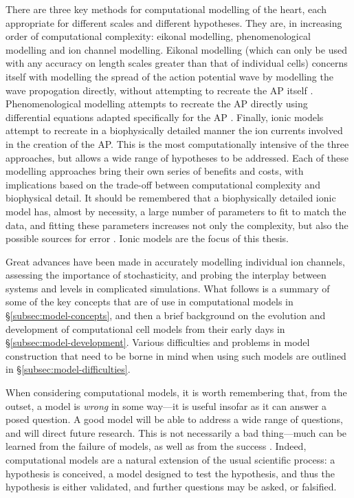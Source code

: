 \documentclass[../thesis-main.tex]{subfiles}
\begin{document}
There are three key methods for computational modelling of the heart, each appropriate for different scales and different hypotheses. They are, in increasing order of computational complexity: eikonal modelling, phenomenological modelling and ion channel modelling. Eikonal modelling (which can only be used with any accuracy on length scales greater than that of individual cells) concerns itself with modelling the spread of the action potential wave by modelling the wave propogation directly, without attempting to recreate the AP itself \citep{Keener2009}. Phenomenological modelling attempts to recreate the AP directly using differential equations adapted specifically for the AP \citep{Bueno-Orovio2008}. Finally, ionic models attempt to recreate in a biophysically detailed manner the ion currents involved in the creation of the AP. This is the most computationally intensive of the three approaches, but allows a wide range of hypotheses to be addressed. Each of these modelling approaches bring their own series of benefits and costs, with implications based on the trade-off between computational complexity and biophysical detail. It should be remembered that a biophysically detailed ionic model has, almost by necessity, a large number of parameters to fit to match the data, and fitting these parameters increases not only the complexity, but also the possible sources for error \citep{Relan2011}. Ionic models are the focus of this thesis.

Great advances have been made in accurately modelling individual ion channels, assessing the importance of stochasticity, and probing the interplay between systems and levels in complicated simulations. What follows is a summary of some of the key concepts that are of use in computational models in \S\ref{subsec:model-concepts}, and then a brief background on the evolution and development of computational cell models from their early days in \S\ref{subsec:model-development}. Various difficulties and problems in model construction that need to be borne in mind when using such models are outlined in \S\ref{subsec:model-difficulties}.

When considering computational models, it is worth remembering that, from the outset, a model is \emph{wrong} in some way---it is useful insofar as it can answer a posed question. A good model will be able to address a wide range of questions, and will direct future research. This is not necessarily a bad thing---much can be learned from the failure of models, as well as from the success \citep{Noble2001, Quinn2013}. Indeed, computational models are a natural extension of the usual scientific process: a hypothesis is conceived, a model designed to test the hypothesis, and thus the hypothesis is either validated, and further questions may be asked, or falsified.
\end{document}
